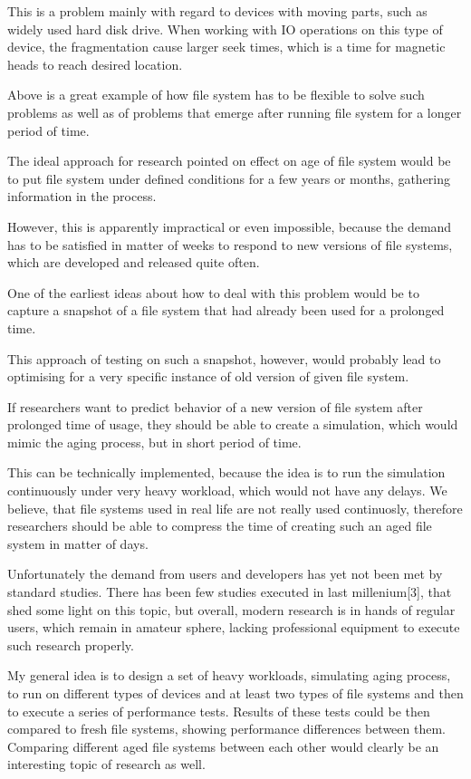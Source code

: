 \documentclass[
  color, %
  table, %
  lof,   %
  lot,   %
]{fithesis3}
\begin{document}
This is a problem mainly with regard to devices with moving parts, such as widely used hard disk drive. When working with IO operations on this type of device, the fragmentation cause larger seek times, which is a time for magnetic heads to reach desired location.

Above is a great example of how file system has to be flexible to solve such problems as well as of problems that emerge after running file system for a longer period of time.

The ideal approach for research pointed on effect on age of file system would be to put file system under defined conditions for a few years or months, gathering information in the process. 

However, this is apparently impractical or even impossible, because the demand has to be satisfied in matter of weeks to respond to new versions of file systems, which are developed and released quite often.

One of the earliest ideas about how to deal with this problem would be to capture a snapshot of a file system that had already been used for a prolonged time. 

This approach of testing on such a snapshot, however, would probably lead to optimising for a very specific instance of old version of given file system. 

If researchers want to predict behavior of a new version of file system after prolonged time of usage, they should be able to create a simulation, which would mimic the aging process, but in short period of time.

This can be technically implemented, because the idea is to run the simulation continuously under very heavy workload, which would not have any delays. We believe, that file systems used in real life are not really used continuosly, therefore researchers should be able to compress the time of creating such an aged file system in matter of days.

Unfortunately the demand from users and developers has yet not been met by standard studies. There has been few studies executed in last millenium[3], that shed some light on this topic, but overall, modern research is in hands of regular users, which remain in amateur sphere, lacking professional equipment to execute such research properly.

My general idea is to design a set of heavy workloads, simulating aging process, to run on different types of devices and at least two types of file systems and then to execute a series of performance tests. Results of these tests could be then compared to fresh file systems, showing performance differences between them. Comparing different aged file systems between each other would clearly be an interesting topic of research as well.
\end{document}
